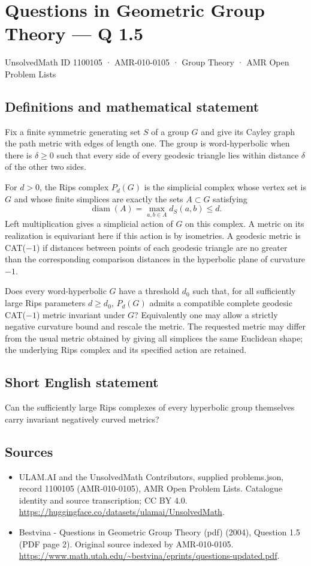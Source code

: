 \documentclass[11pt,a4paper]{article}
\begin{document}
\section*{Questions in Geometric Group Theory — Q 1.5}\label{1100105}
{\small UnsolvedMath ID 1100105 · AMR-010-0105 · Group Theory · AMR Open Problem Lists}
\subsection{Definitions and mathematical statement}
Fix a finite symmetric generating set $S$ of a group $G$ and give its Cayley graph the path metric with edges of length one. The group is word-hyperbolic when there is $\delta\geq0$ such that every side of every geodesic triangle lies within distance $\delta$ of the other two sides.

For $d>0$, the Rips complex $P_d(G)$ is the simplicial complex whose vertex set is $G$ and whose finite simplices are exactly the sets $A\subset G$ satisfying
\[
 \operatorname{diam}(A)=\max_{a,b\in A}d_S(a,b)\leq d.
\]
Left multiplication gives a simplicial action of $G$ on this complex. A metric on its realization is equivariant here if this action is by isometries. A geodesic metric is CAT($-1$) if distances between points of each geodesic triangle are no greater than the corresponding comparison distances in the hyperbolic plane of curvature $-1$.

Does every word-hyperbolic $G$ have a threshold $d_0$ such that, for all sufficiently large Rips parameters $d\geq d_0$, $P_d(G)$ admits a compatible complete geodesic CAT($-1$) metric invariant under $G$? Equivalently one may allow a strictly negative curvature bound and rescale the metric. The requested metric may differ from the usual metric obtained by giving all simplices the same Euclidean shape; the underlying Rips complex and its specified action are retained.
\subsection{Short English statement}
Can the sufficiently large Rips complexes of every hyperbolic group themselves carry invariant negatively curved metrics?
\subsection{Sources}
\begin{itemize}
\item[S1] ULAM.AI and the UnsolvedMath Contributors, supplied problems.json, record 1100105 (AMR-010-0105), AMR Open Problem Lists. Catalogue identity and source transcription; CC BY 4.0.
\url{https://huggingface.co/datasets/ulamai/UnsolvedMath}.
\item[S2] Bestvina - Questions in Geometric Group Theory (pdf) (2004), Question 1.5 (PDF page 2). Original source indexed by AMR-010-0105.
\url{https://www.math.utah.edu/~bestvina/eprints/questions-updated.pdf}.
\end{itemize}
\end{document}

